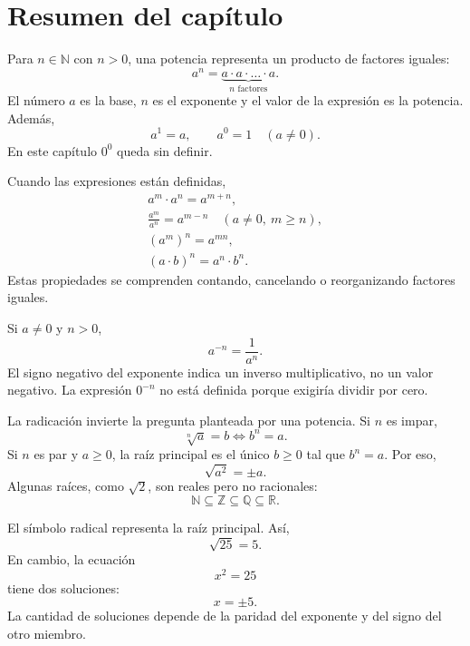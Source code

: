 \section{Resumen del capítulo}

\begin{tcolorbox}[resumen,title=Potencias]
Para \(n\in\mathbb N\) con \(n>0\), una potencia representa un producto de factores iguales:
\[
a^n=\underbrace{a\cdot a\cdot\ldots\cdot a}_{n\text{ factores}}.
\]
El número \(a\) es la base, \(n\) es el exponente y el valor de la expresión es la potencia. Además,
\[
a^1=a,
\qquad
a^0=1\quad(a\ne0).
\]
En este capítulo \(0^0\) queda sin definir.
\end{tcolorbox}

\begin{tcolorbox}[resumen,title=Propiedades con exponentes naturales]
Cuando las expresiones están definidas,
\begin{gather*}
a^m\cdot a^n=a^{m+n},\\
\frac{a^m}{a^n}=a^{m-n}\quad(a\ne0,\ m\ge n),\\
(a^m)^n=a^{mn},\\
(a\cdot b)^n=a^n\cdot b^n.
\end{gather*}
Estas propiedades se comprenden contando, cancelando o reorganizando factores iguales.
\end{tcolorbox}

\begin{tcolorbox}[resumen,title=Exponentes enteros negativos]
Si \(a\ne0\) y \(n>0\),
\[
a^{-n}=\frac1{a^n}.
\]
El signo negativo del exponente indica un inverso multiplicativo, no un valor negativo. La expresión \(0^{-n}\) no está definida porque exigiría dividir por cero.
\end{tcolorbox}

\begin{tcolorbox}[resumen,title=Raíces y números reales]
La radicación invierte la pregunta planteada por una potencia. Si \(n\) es impar,
\[
\sqrt[n]{a}=b\Longleftrightarrow b^n=a.
\]
Si \(n\) es par y \(a\ge0\), la raíz principal es el único \(b\ge0\) tal que \(b^n=a\). Por eso,
\[
\sqrt{a^2}=\pm a.
\]
Algunas raíces, como \(\sqrt2\), son reales pero no racionales:
\[
\mathbb N\subseteq\mathbb Z\subseteq\mathbb Q\subseteq\mathbb R.
\]
\end{tcolorbox}

\begin{tcolorbox}[resumen,title=Raíz principal y ecuaciones]
El símbolo radical representa la raíz principal. Así,
\[
\sqrt{25}=5.
\]
En cambio, la ecuación
\[
x^2=25
\]
tiene dos soluciones:
\[
x=\pm5.
\]
La cantidad de soluciones depende de la paridad del exponente y del signo del otro miembro.
\end{tcolorbox}

